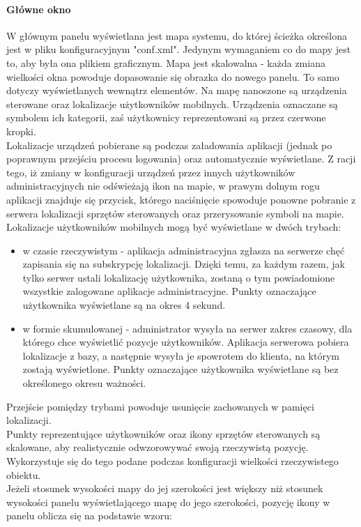 \documentclass{article}
\begin{document}
		\paragraph{Główne okno}
		W głównym panelu wyświetlana jest mapa systemu, do której ścieżka określona jest w pliku konfiguracyjnym "conf.xml". Jedynym wymaganiem co do mapy jest to, aby była ona plikiem graficznym. Mapa jest skalowalna - każda zmiana wielkości okna powoduje dopasowanie się obrazka do nowego panelu. To samo dotyczy wyświetlanych wewnątrz elementów. Na mapę nanoszone są urządzenia sterowane oraz lokalizacje użytkowników mobilnych. Urządzenia oznaczane są symbolem ich kategorii, zaś użytkownicy reprezentowani są przez czerwone kropki.\\
		Lokalizacje urządzeń pobierane są podczas załadowania aplikacji (jednak po poprawnym przejściu procesu logowania) oraz automatycznie wyświetlane. Z racji tego, iż zmiany w konfiguracji urządzeń przez innych użytkowników administracyjnych nie odświeżają ikon na mapie, w prawym dolnym rogu aplikacji znajduje się przycisk, którego naciśnięcie spowoduje ponowne pobranie z serwera lokalizacji sprzętów sterowanych oraz przerysowanie symboli na mapie.\\
		Lokalizacje użytkowników mobilnych mogą być wyświetlane w dwóch trybach:
		\begin{itemize}
			\item w czasie rzeczywistym - aplikacja administracyjna zgłasza na serwerze chęć zapisania się na subskrypcję lokalizacji. Dzięki temu, za każdym razem, jak tylko serwer ustali lokalizację użytkownika, zostaną o tym powiadomione wszystkie zalogowane aplikacje administracyjne. Punkty oznaczające użytkownika wyświetlane są na okres 4 sekund.
			\item w formie skumulowanej - administrator wysyła na serwer zakres czasowy, dla którego chce wyświetlić pozycje użytkowników. Aplikacja serwerowa pobiera lokalizacje z bazy, a następnie wysyła je spowrotem do klienta, na którym zostają wyświetlone. Punkty oznaczające użytkownika wyświetlane są bez określonego okresu ważności.
		\end{itemize}
		Przejście pomiędzy trybami powoduje usunięcie zachowanych w pamięci lokalizacji.\\
		Punkty reprezentujące użytkowników oraz ikony sprzętów sterowanych są skalowane, aby realistycznie odwzorowywać swoją rzeczywistą pozycję. Wykorzystuje się do tego podane podczas konfiguracji wielkości rzeczywistego obiektu.\\
		Jeżeli stosunek wysokości mapy do jej szerokości jest większy niż stosunek wysokości panelu wyświetlającego mapę do jego szerokości, pozycję ikony w panelu oblicza się na podstawie wzoru:
\end{document}

